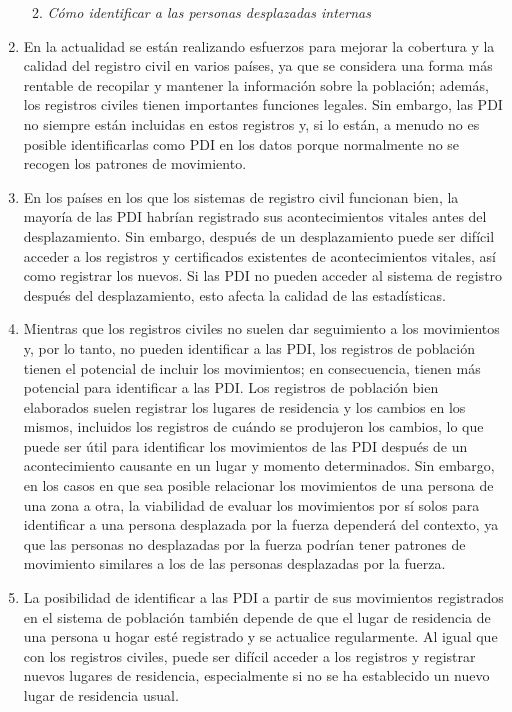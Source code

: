 \documentclass[
]{book}
\providecommand{\tightlist}{%
  \setlength{\itemsep}{0pt}\setlength{\parskip}{0pt}}
\begin{document}
\begin{enumerate}
  \begin{enumerate}
  \def\labelenumii{\arabic{enumii}.}
  \tightlist
  \item
    \emph{Cómo identificar a las personas desplazadas internas}
  \end{enumerate}
\item
  En la actualidad se están realizando esfuerzos para mejorar la cobertura y la calidad del registro civil en varios países, ya que se considera una forma más rentable de recopilar y mantener la información sobre la población; además, los registros civiles tienen importantes funciones legales. Sin embargo, las PDI no siempre están incluidas en estos registros y, si lo están, a menudo no es posible identificarlas como PDI en los datos porque normalmente no se recogen los patrones de movimiento.
\item
  En los países en los que los sistemas de registro civil funcionan bien, la mayoría de las PDI habrían registrado sus acontecimientos vitales antes del desplazamiento. Sin embargo, después de un desplazamiento puede ser difícil acceder a los registros y certificados existentes de acontecimientos vitales, así como registrar los nuevos. Si las PDI no pueden acceder al sistema de registro después del desplazamiento, esto afecta la calidad de las estadísticas.
\item
  Mientras que los registros civiles no suelen dar seguimiento a los movimientos y, por lo tanto, no pueden identificar a las PDI, los registros de población tienen el potencial de incluir los movimientos; en consecuencia, tienen más potencial para identificar a las PDI. Los registros de población bien elaborados suelen registrar los lugares de residencia y los cambios en los mismos, incluidos los registros de cuándo se produjeron los cambios, lo que puede ser útil para identificar los movimientos de las PDI después de un acontecimiento causante en un lugar y momento determinados. Sin embargo, en los casos en que sea posible relacionar los movimientos de una persona de una zona a otra, la viabilidad de evaluar los movimientos por sí solos para identificar a una persona desplazada por la fuerza dependerá del contexto, ya que las personas no desplazadas por la fuerza podrían tener patrones de movimiento similares a los de las personas desplazadas por la fuerza.
\item
  La posibilidad de identificar a las PDI a partir de sus movimientos registrados en el sistema de población también depende de que el lugar de residencia de una persona u hogar esté registrado y se actualice regularmente. Al igual que con los registros civiles, puede ser difícil acceder a los registros y registrar nuevos lugares de residencia, especialmente si no se ha establecido un nuevo lugar de residencia usual.

\end{enumerate}
\end{document}
